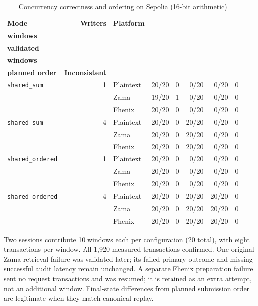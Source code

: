\begin{table}[!t]
\caption{Concurrency correctness and ordering on Sepolia (16-bit arithmetic)}
\label{tab:concurrency-correctness}
\centering
\scriptsize
\setlength{\tabcolsep}{3pt}
\begin{tabular}{|l|r|l|r|r|r|r|r|}
\hline
\textbf{Mode} & \textbf{Writers} & \textbf{Platform} & \shortstack{\textbf{Primary valid}\\\textbf{windows}} & \shortstack{\textbf{Late}\\\textbf{validated}} & \shortstack{\textbf{Reordered}\\\textbf{windows}} & \shortstack{\textbf{Final $\ne$}\\\textbf{planned order}} & \textbf{Inconsistent} \\
\hline
\texttt{shared\_sum} & 1 & Plaintext & 20/20 & 0 & 0/20 & 0/20 & 0 \\
 &  & Zama & 19/20 & 1 & 0/20 & 0/20 & 0 \\
 &  & Fhenix & 20/20 & 0 & 0/20 & 0/20 & 0 \\
\hline
\texttt{shared\_sum} & 4 & Plaintext & 20/20 & 0 & 20/20 & 0/20 & 0 \\
 &  & Zama & 20/20 & 0 & 20/20 & 0/20 & 0 \\
 &  & Fhenix & 20/20 & 0 & 20/20 & 0/20 & 0 \\
\hline
\texttt{shared\_ordered} & 1 & Plaintext & 20/20 & 0 & 0/20 & 0/20 & 0 \\
 &  & Zama & 20/20 & 0 & 0/20 & 0/20 & 0 \\
 &  & Fhenix & 20/20 & 0 & 0/20 & 0/20 & 0 \\
\hline
\texttt{shared\_ordered} & 4 & Plaintext & 20/20 & 0 & 20/20 & 20/20 & 0 \\
 &  & Zama & 20/20 & 0 & 20/20 & 20/20 & 0 \\
 &  & Fhenix & 20/20 & 0 & 20/20 & 20/20 & 0 \\
\hline
\end{tabular}
\par\smallskip
\begin{minipage}{\textwidth}\scriptsize Two sessions contribute 10 windows each per configuration (20 total), with eight transactions per window. All 1,920 measured transactions confirmed. One original Zama retrieval failure was validated later; its failed primary outcome and missing successful audit latency remain unchanged. A separate Fhenix preparation failure sent no request transactions and was resumed; it is retained as an extra attempt, not an additional window. Final-state differences from planned submission order are legitimate when they match canonical replay.\end{minipage}
\end{table}
